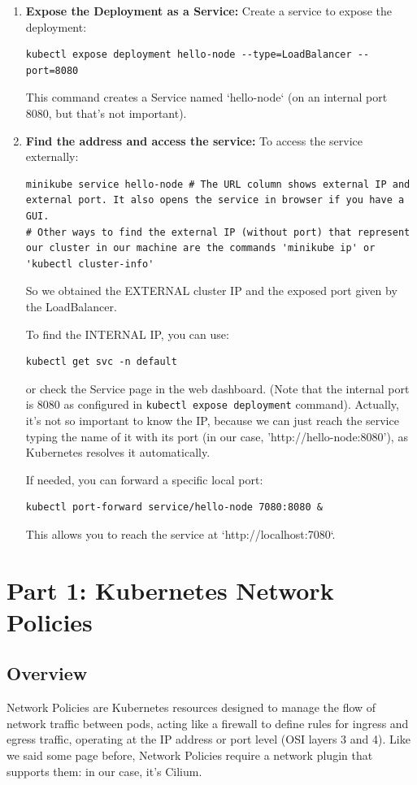 \documentclass{article}
\begin{document}
\begin{enumerate}
\begin{itemize}
    \end{itemize}

    \item \textbf{Expose the Deployment as a Service:}
    Create a service to expose the deployment:
    \begin{lstlisting}
kubectl expose deployment hello-node --type=LoadBalancer --port=8080
    \end{lstlisting}
    This command creates a Service named `hello-node` (on an internal port 8080, but that's not important). 
    
    \item \textbf{Find the address and access the service:}
    To access the service externally:
    \begin{lstlisting}
minikube service hello-node # The URL column shows external IP and external port. It also opens the service in browser if you have a GUI.
# Other ways to find the external IP (without port) that represent our cluster in our machine are the commands 'minikube ip' or 'kubectl cluster-info'
    \end{lstlisting}
    So we obtained the EXTERNAL cluster IP and the exposed port given by the LoadBalancer.

    To find the INTERNAL IP, you can use:
    \begin{lstlisting}
kubectl get svc -n default
    \end{lstlisting}
    or check the Service page in the web dashboard. (Note that the internal port is 8080 as configured in \texttt{kubectl expose deployment} command). Actually, it's not so important to know the IP, because we can just reach the service typing the name of it with its port (in our case, 'http://hello-node:8080'), as Kubernetes resolves it automatically.

    If needed, you can forward a specific local port:
    \begin{lstlisting}
kubectl port-forward service/hello-node 7080:8080 &
    \end{lstlisting}
    This allows you to reach the service at `http://localhost:7080`.
\end{enumerate}

\newpage

\section{Part 1: Kubernetes Network Policies}
\subsection{Overview}
Network Policies are Kubernetes resources designed to manage the flow of network traffic between pods, acting like a firewall to define rules for ingress and egress traffic, operating at the IP address or port level (OSI layers 3 and 4). Like we said some page before, Network Policies require a network plugin that supports them: in our case, it's Cilium. \\
\end{document}
